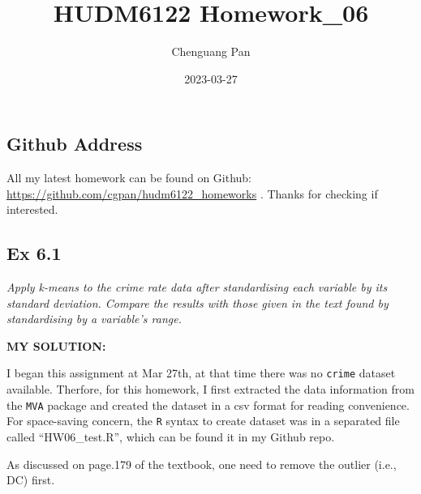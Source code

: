 \documentclass[
]{article}
\title{HUDM6122 Homework\_06}
\author{Chenguang Pan}
\date{2023-03-27}
\begin{document}
\maketitle

\hypertarget{github-address}{%
\subsection{Github Address}\label{github-address}}

All my latest homework can be found on Github:
\url{https://github.com/cgpan/hudm6122_homeworks} . Thanks for checking
if interested.

\hypertarget{ex-6.1}{%
\subsection{Ex 6.1}\label{ex-6.1}}

\emph{Apply k-means to the crime rate data after standardising each
variable by its standard deviation. Compare the results with those given
in the text found by standardising by a variable's range.}

\textbf{MY SOLUTION:}

I began this assignment at Mar 27th, at that time there was no
\texttt{crime} dataset available. Therfore, for this homework, I first
extracted the data information from the \texttt{MVA} package and created
the dataset in a csv format for reading convenience. For space-saving
concern, the \texttt{R} syntax to create dataset was in a separated file
called ``HW06\_test.R'', which can be found it in my Github repo.

As discussed on page.179 of the textbook, one need to remove the outlier
(i.e., DC) first.
\end{document}
